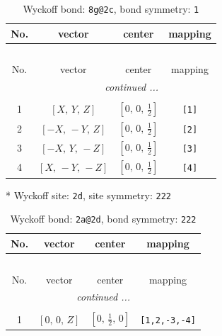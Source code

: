 \documentclass[fleqn,8pt]{jsarticle}
\begin{document}
\begin{longtable}{cccc}
\caption{Wyckoff bond: {\tt 8g@2c}, bond symmetry: {\tt 1}}
 \\
 \hline \hline
No. & vector & center & mapping \\ \hline \endfirsthead

\multicolumn{3}{l}{\tablename\ \thetable{}} \\
 \hline \hline
No. & vector & center & mapping \\ \hline \endhead

 \hline \hline
\multicolumn{3}{r}{\footnotesize\it continued ...} \\ \endfoot

 \hline \hline
\multicolumn{3}{r}{} \\ \endlastfoot

1 & $\left[ X,\, Y,\, Z \right]$ & $\left[ 0,\, 0,\, \frac{1}{2} \right]$ & {\tt [1]} \\ \hline
2 & $\left[ - X,\, - Y,\, Z \right]$ & $\left[ 0,\, 0,\, \frac{1}{2} \right]$ & {\tt [2]} \\ \hline
3 & $\left[ - X,\, Y,\, - Z \right]$ & $\left[ 0,\, 0,\, \frac{1}{2} \right]$ & {\tt [3]} \\ \hline
4 & $\left[ X,\, - Y,\, - Z \right]$ & $\left[ 0,\, 0,\, \frac{1}{2} \right]$ & {\tt [4]} \\
\end{longtable}
* Wyckoff site: {\tt 2d}, site symmetry: {\tt 222}
\renewcommand{\arraystretch}{1.2}
\begin{longtable}{cccc}
\caption{Wyckoff bond: {\tt 2a@2d}, bond symmetry: {\tt 222}}
 \\
 \hline \hline
No. & vector & center & mapping \\ \hline \endfirsthead

\multicolumn{3}{l}{\tablename\ \thetable{}} \\
 \hline \hline
No. & vector & center & mapping \\ \hline \endhead

 \hline \hline
\multicolumn{3}{r}{\footnotesize\it continued ...} \\ \endfoot

 \hline \hline
\multicolumn{3}{r}{} \\ \endlastfoot

1 & $\left[ 0,\, 0,\, Z \right]$ & $\left[ 0,\, \frac{1}{2},\, 0 \right]$ & {\tt [1,2,-3,-4]} \\
\end{longtable}
\renewcommand{\arraystretch}{1.2}
\end{document}
